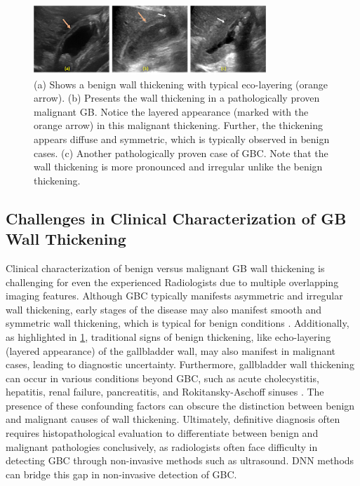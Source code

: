 \begin{figure}[t]
    \centering
    \includegraphics[width=0.8\linewidth, height=7em]{figs/clinical.png}
    \caption[Appearances of benign and malignant wall thickening]{(a) Shows a benign wall thickening with typical eco-layering (orange arrow). (b) Presents the wall thickening in a pathologically proven malignant GB. Notice the layered appearance (marked with the orange arrow) in this malignant thickening. Further, the thickening appears diffuse and symmetric, which is typically observed in benign cases. (c) Another pathologically proven case of GBC. Note that the wall thickening is more pronounced and irregular unlike the benign thickening.}
    \label{fig:clinical}
\end{figure}

\subsection{Challenges in Clinical Characterization of GB Wall Thickening}
\label{sec:clinical}
%
Clinical characterization of benign versus malignant GB wall thickening is challenging for even the experienced Radiologists due to multiple overlapping imaging features. Although GBC typically manifests asymmetric and irregular wall thickening, early stages of the disease may also manifest smooth and symmetric wall thickening, which is typical for benign conditions \cite{gupta2020imaging}. Additionally, as highlighted in \cref{fig:clinical}, traditional signs of benign thickening, like echo-layering (layered appearance) of the gallbladder wall, may also manifest in malignant cases, leading to diagnostic uncertainty. Furthermore, gallbladder wall thickening can occur in various conditions beyond GBC, such as acute cholecystitis, hepatitis, renal failure, pancreatitis, and Rokitansky-Aschoff sinuses \cite{gbc-lancet, gbc-xgc, gupta2020imaging}. The presence of these confounding factors can obscure the distinction between benign and malignant causes of wall thickening.
Ultimately, definitive diagnosis often requires histopathological evaluation to differentiate between benign and malignant pathologies conclusively, as radiologists often face difficulty in detecting GBC through non-invasive methods such as ultrasound. DNN methods can bridge this gap in non-invasive detection of GBC.

